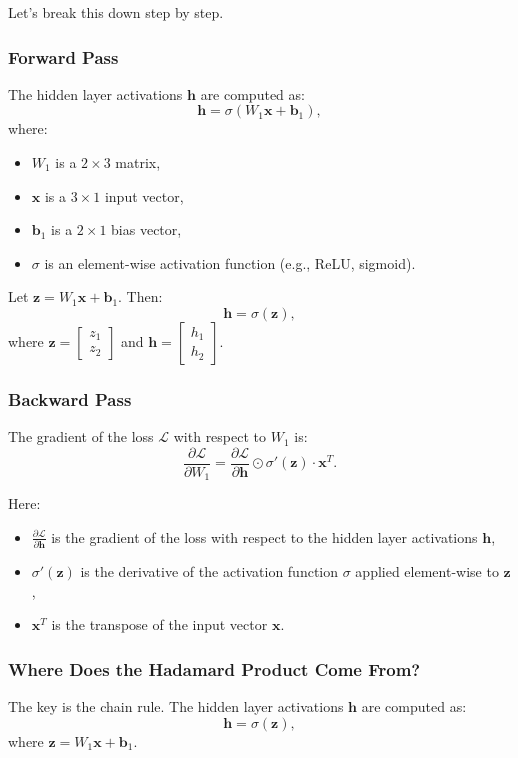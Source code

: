 \begin{notechapter}
Let’s break this down step by step.

\subsubsection{Forward Pass}
The hidden layer activations \( \mathbf{h} \) are computed as:
\[
\mathbf{h} = \sigma(W_1 \mathbf{x} + \mathbf{b}_1),
\]
where:
\begin{itemize}
    \item \( W_1 \) is a \( 2 \times 3 \) matrix,
    \item \( \mathbf{x} \) is a \( 3 \times 1 \) input vector,
    \item \( \mathbf{b}_1 \) is a \( 2 \times 1 \) bias vector,
    \item \( \sigma \) is an element-wise activation function (e.g., ReLU, sigmoid).
\end{itemize}

Let \( \mathbf{z} = W_1 \mathbf{x} + \mathbf{b}_1 \). Then:
\[
\mathbf{h} = \sigma(\mathbf{z}),
\]
where \( \mathbf{z} = \begin{bmatrix} z_1 \\ z_2 \end{bmatrix} \) and \( \mathbf{h} = \begin{bmatrix} h_1 \\ h_2 \end{bmatrix} \).

\subsubsection{Backward Pass}
The gradient of the loss \( \mathcal{L} \) with respect to \( W_1 \) is:
\[
\frac{\partial \mathcal{L}}{\partial W_1} = \frac{\partial \mathcal{L}}{\partial \mathbf{h}} \odot \sigma'(\mathbf{z}) \cdot \mathbf{x}^T.
\]

Here:
\begin{itemize}
    \item \( \frac{\partial \mathcal{L}}{\partial \mathbf{h}} \) is the gradient of the loss with respect to the hidden layer activations \( \mathbf{h} \),
    \item \( \sigma'(\mathbf{z}) \) is the derivative of the activation function \( \sigma \) applied element-wise to \( \mathbf{z} \),
    \item \( \mathbf{x}^T \) is the transpose of the input vector \( \mathbf{x} \).
\end{itemize}

\subsubsection{Where Does the Hadamard Product Come From?}
The key is the chain rule. The hidden layer activations \( \mathbf{h} \) are computed as:
\[
\mathbf{h} = \sigma(\mathbf{z}),
\]
where \( \mathbf{z} = W_1 \mathbf{x} + \mathbf{b}_1 \).


\end{notechapter}

